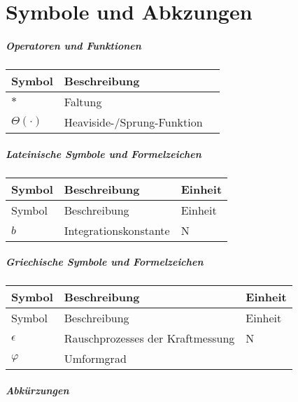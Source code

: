 \chapter*{Symbole und Abkzungen}
%
\paragraph*{Operatoren und Funktionen}
\begin{tabularx}{\textwidth}{@{}l@{\qquad}X@{\quad}p{18mm}}
\toprule
	Symbol & Beschreibung & \\ \midrule
	$*$ & Faltung\\
	$\Theta(\cdot)$ & Heaviside-/Sprung-Funktion\\
\end{tabularx}
%
\paragraph*{Lateinische Symbole und Formelzeichen}
\begin{longtable}{@{}l@{\qquad}p{}@{\quad}p{18mm}}
\toprule
Symbol & Beschreibung & Einheit\\ \midrule
\endfirsthead
\toprule
Symbol & Beschreibung & Einheit\\ \midrule
\endhead

	
	
	$b$ & Integrationskonstante & N\\

\end{longtable}
\paragraph*{Griechische Symbole und Formelzeichen}
\begin{longtable}{@{}l@{\qquad}p{}@{\quad}p{18mm}}
\toprule
Symbol & Beschreibung & Einheit\\ \midrule
\endfirsthead
\toprule
Symbol & Beschreibung & Einheit\\ \midrule
\endhead
	$\epsilon$ & Rauschprozesses der Kraftmessung & N\\
	$\varphi$ & Umformgrad & \\
\end{longtable}

\newpage
\paragraph*{Abkürzungen}

